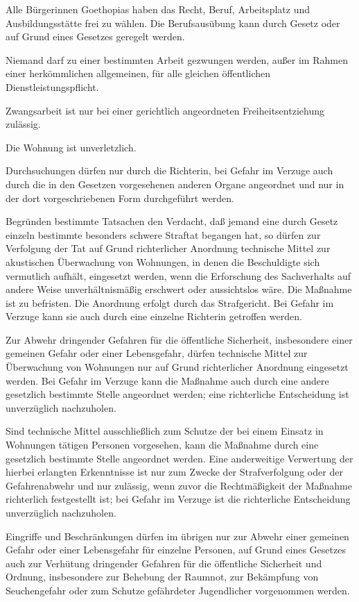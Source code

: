 \documentclass{sasbase}
\begin{document}
\begin{article}
	\item Alle B\"{u}rgerinnen Goethopias haben das Recht, Beruf, Arbeitsplatz und Ausbildungsstätte frei zu wählen. Die Berufsausübung kann durch Gesetz oder auf Grund eines Gesetzes geregelt werden.	
	\item Niemand darf zu einer bestimmten Arbeit gezwungen werden, außer im Rahmen einer herkömmlichen allgemeinen, für alle gleichen öffentlichen Dienstleistungspflicht.
	\item Zwangsarbeit ist nur bei einer gerichtlich angeordneten Freiheitsentziehung zulässig.
\end{article}

\begin{article}[Privatsph\"{a}re]
	\item Die Wohnung ist unverletzlich.
	\item Durchsuchungen dürfen nur durch die Richterin, bei Gefahr im Verzuge auch durch die in den Gesetzen vorgesehenen anderen Organe angeordnet und nur in der dort vorgeschriebenen Form durchgeführt werden.
	\item Begründen bestimmte Tatsachen den Verdacht, daß jemand eine durch Gesetz einzeln bestimmte besonders schwere Straftat begangen hat, so dürfen zur Verfolgung der Tat auf Grund richterlicher Anordnung technische Mittel zur akustischen Überwachung von Wohnungen, in denen die Beschuldigte sich vermutlich aufhält, eingesetzt werden, wenn die Erforschung des Sachverhalts auf andere Weise unverhältnismäßig erschwert oder aussichtslos wäre. Die Maßnahme ist zu befristen. Die Anordnung erfolgt durch das Strafgericht. Bei Gefahr im Verzuge kann sie auch durch eine einzelne Richterin getroffen werden.
	\item Zur Abwehr dringender Gefahren für die öffentliche Sicherheit, insbesondere einer gemeinen Gefahr oder einer Lebensgefahr, dürfen technische Mittel zur Überwachung von Wohnungen nur auf Grund richterlicher Anordnung eingesetzt werden. Bei Gefahr im Verzuge kann die Maßnahme auch durch eine andere gesetzlich bestimmte Stelle angeordnet werden; eine richterliche Entscheidung ist unverzüglich nachzuholen.
	\item Sind technische Mittel ausschließlich zum Schutze der bei einem Einsatz in Wohnungen tätigen Personen vorgesehen, kann die Maßnahme durch eine gesetzlich bestimmte Stelle angeordnet werden. Eine anderweitige Verwertung der hierbei erlangten Erkenntnisse ist nur zum Zwecke der Strafverfolgung oder der Gefahrenabwehr und nur zulässig, wenn zuvor die Rechtmäßigkeit der Maßnahme richterlich festgestellt ist; bei Gefahr im Verzuge ist die richterliche Entscheidung unverzüglich nachzuholen.
	\item Eingriffe und Beschränkungen dürfen im übrigen nur zur Abwehr einer gemeinen Gefahr oder einer Lebensgefahr für einzelne Personen, auf Grund eines Gesetzes auch zur Verhütung dringender Gefahren für die öffentliche Sicherheit und Ordnung, insbesondere zur Behebung der Raumnot, zur Bekämpfung von Seuchengefahr oder zum Schutze gefährdeter Jugendlicher vorgenommen werden.
\end{article}
\end{document}
